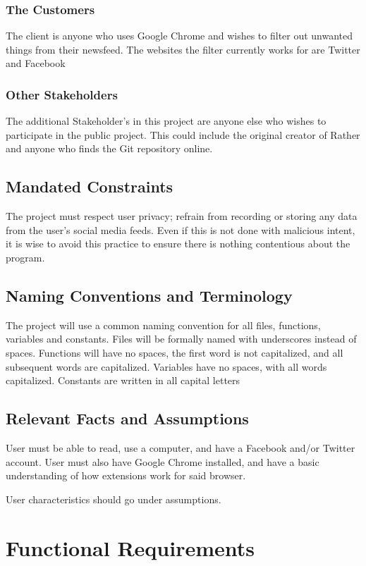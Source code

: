 \documentclass[12pt, titlepage]{article}
\begin{document}
\subsubsection{The Customers}
The client is anyone who uses Google Chrome and wishes to filter out unwanted things from their newsfeed. The websites the filter currently works for are Twitter and Facebook

\subsubsection{Other Stakeholders}
The additional Stakeholder's in this project are anyone else who wishes to participate in the public project. This could include the original creator of Rather and anyone who finds the Git repository online. 

\subsection{Mandated Constraints}
The project must respect user privacy; refrain from recording or storing any data from the user's social media feeds. Even if this is not done with malicious intent, it is wise to avoid this practice to ensure there is nothing contentious about the program.

\subsection{Naming Conventions and Terminology}
The project will use a common naming convention for all files, functions, variables and constants. Files will be formally named with underscores instead of spaces. Functions will have no spaces, the first word is not capitalized, and all subsequent words are capitalized. Variables have no spaces, with all words capitalized. Constants are written in all capital letters 

\subsection{Relevant Facts and Assumptions}
User must be able to read, use a computer, and have a Facebook and/or Twitter account. User must also have Google Chrome installed, and have a basic understanding of how extensions work for said browser.

User characteristics should go under assumptions.

\section{Functional Requirements}
\end{document}
